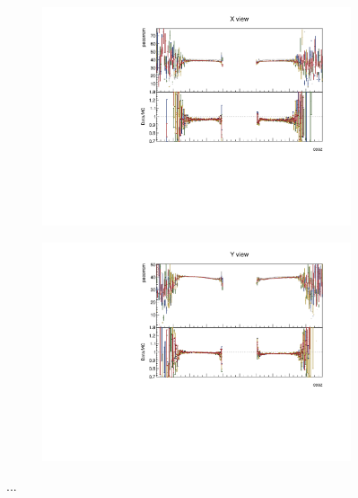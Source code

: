 \documentclass[12pt,a4paper]{article}
\begin{document}
\begin{figure}[h!]
\begin{subfigure}{0.5\textwidth}
  \end{subfigure}
  \begin{subfigure}{0.5\textwidth}
    \includegraphics[width=\linewidth]{PlotsAngularDistribution/pecorrcm_cosz_x.pdf}
  \end{subfigure}
  \begin{subfigure}{0.5\textwidth}
    \includegraphics[width=\linewidth]{PlotsAngularDistribution/pecorrcm_cosz_y.pdf}
  \end{subfigure}
  \caption{...}
  \label{figAbsCalibCosZ1}
\end{figure}
\end{document}
